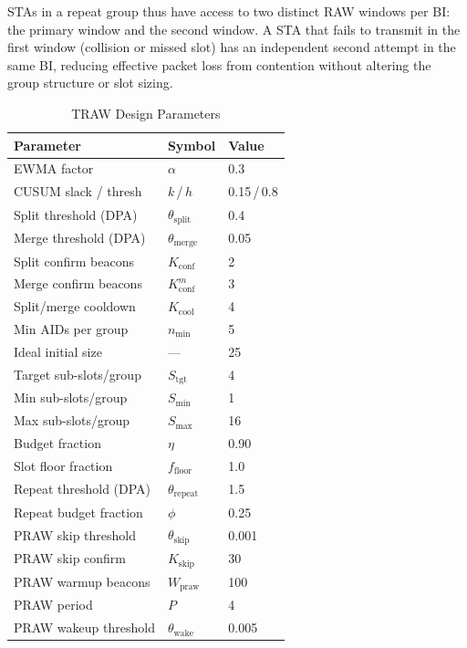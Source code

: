 \documentclass[conference]{IEEEtran}
\begin{document}
STAs in a repeat group thus have access to two distinct RAW windows per
BI: the primary window and the second window.
A STA that fails to transmit in the first window (collision or missed
slot) has an independent second attempt in the same BI, reducing
effective packet loss from contention without altering the group
structure or slot sizing.

\begin{table}[!t]
\renewcommand{\arraystretch}{1.15}
\caption{TRAW Design Parameters}
\label{tab:params}
\centering
\begin{tabular}{@{}lll@{}}
\toprule
\textbf{Parameter} & \textbf{Symbol} & \textbf{Value} \\
\midrule
EWMA factor            & $\alpha$                      & 0.3 \\
CUSUM slack / thresh   & $k$\,/\,$h$                   & 0.15\,/\,0.8 \\
Split threshold (DPA)  & $\theta_\mathrm{split}$       & 0.4 \\
Merge threshold (DPA)  & $\theta_\mathrm{merge}$       & 0.05 \\
Split confirm beacons  & $K_\mathrm{conf}$             & 2 \\
Merge confirm beacons  & $K_\mathrm{conf}^m$           & 3 \\
Split/merge cooldown   & $K_\mathrm{cool}$             & 4 \\
Min AIDs per group     & $n_\mathrm{min}$              & 5 \\
Ideal initial size     & ---                           & 25 \\
Target sub-slots/group & $S_\mathrm{tgt}$              & 4 \\
Min sub-slots/group    & $S_\mathrm{min}$              & 1 \\
Max sub-slots/group    & $S_\mathrm{max}$              & 16 \\
Budget fraction        & $\eta$                        & 0.90 \\
Slot floor fraction    & $f_\mathrm{floor}$            & 1.0 \\
Repeat threshold (DPA) & $\theta_\mathrm{repeat}$      & 1.5 \\
Repeat budget fraction & $\phi$                        & 0.25 \\
PRAW skip threshold    & $\theta_\mathrm{skip}$        & 0.001 \\
PRAW skip confirm      & $K_\mathrm{skip}$             & 30 \\
PRAW warmup beacons    & $W_\mathrm{praw}$             & 100 \\
PRAW period            & $P$                           & 4 \\
PRAW wakeup threshold  & $\theta_\mathrm{wake}$        & 0.005 \\
\bottomrule
\end{tabular}
\end{table}
\end{document}
